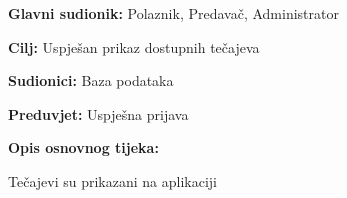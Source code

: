 				\noindent {}
				\begin{packed_item}
					
					\item \textbf{Glavni sudionik:} Polaznik, Predavač, Administrator
					\item  \textbf{Cilj:} Uspješan prikaz dostupnih tečajeva
					\item  \textbf{Sudionici:} Baza podataka
					\item  \textbf{Preduvjet:} Uspješna prijava
					\item  \textbf{Opis osnovnog tijeka:}
					
					\item[] \begin{packed_enum}
						
						\item Tečajevi su prikazani na aplikaciji
						
					\end{packed_enum}
					
				\end{packed_item}
			
